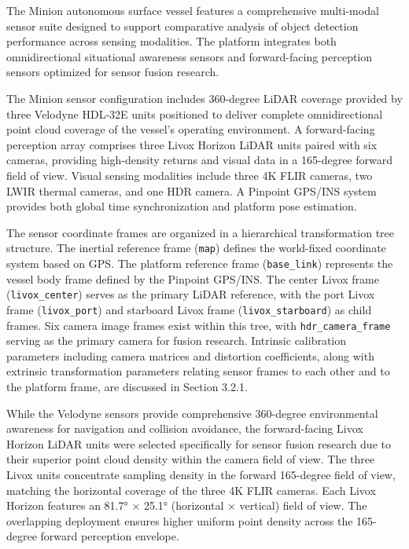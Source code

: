\documentclass{erauthesis}
\begin{document}
The Minion autonomous surface vessel features a comprehensive multi-modal sensor suite designed to support comparative analysis of object detection performance across sensing modalities.
The platform integrates both omnidirectional situational awareness sensors and forward-facing perception sensors optimized for sensor fusion research.

The Minion sensor configuration includes 360-degree \ac{LiDAR} coverage provided by three Velodyne HDL-32E units positioned to deliver complete omnidirectional point cloud coverage of the vessel's operating environment.
A forward-facing perception array comprises three Livox Horizon \ac{LiDAR} units paired with six cameras, providing high-density returns and visual data in a 165-degree forward field of view.
Visual sensing modalities include three 4K FLIR cameras, two \ac{LWIR} thermal cameras, and one \ac{HDR} camera.
A Pinpoint \ac{GPS}/\ac{INS} system provides both global time synchronization and platform pose estimation.

The sensor coordinate frames are organized in a hierarchical transformation tree structure.
The inertial reference frame (\texttt{map}) defines the world-fixed coordinate system based on \ac{GPS}.
The platform reference frame (\texttt{base\_link}) represents the vessel body frame defined by the Pinpoint \ac{GPS}/\ac{INS}.
The center Livox frame (\texttt{livox\_center}) serves as the primary \ac{LiDAR} reference, with the port Livox frame (\texttt{livox\_port}) and starboard Livox frame (\texttt{livox\_starboard}) as child frames.
Six camera image frames exist within this tree, with \texttt{hdr\_camera\_frame} serving as the primary camera for fusion research.
Intrinsic calibration parameters including camera matrices and distortion coefficients, along with extrinsic transformation parameters relating sensor frames to each other and to the platform frame, are discussed in Section 3.2.1.

While the Velodyne sensors provide comprehensive 360-degree environmental awareness for navigation and collision avoidance, the forward-facing Livox Horizon \ac{LiDAR} units were selected specifically for sensor fusion research due to their superior point cloud density within the camera field of view.
The three Livox units concentrate sampling density in the forward 165-degree field of view, matching the horizontal coverage of the three 4K FLIR cameras.
Each Livox Horizon features an 81.7° × 25.1° (horizontal × vertical) field of view.
The overlapping deployment ensures higher uniform point density across the 165-degree forward perception envelope.
\end{document}
